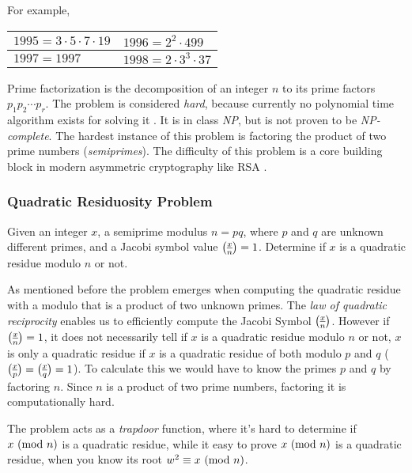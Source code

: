 For example,

\begin{center}
	\begin{tabular}{|l|l|}
		\hline
		$1995 = 3 \cdot 5 \cdot 7 \cdot 19$ & 
		$1996 = 2^2 \cdot 499$ \\
		\hline
		$1997 = 1997$ &
		$1998 = 2 \cdot 3^3 \cdot 37$\\
		\hline
	\end{tabular}
\end{center}


Prime factorization is the decomposition of an integer $n$ to its prime factors $p_1 p_2 \cdots p_r$.
The problem is considered \textit{hard}, because currently no polynomial time algorithm exists for solving it \cite{Buchmann2001}. It is in class \textit{NP}, but is not proven to be \textit{NP-complete}.
The hardest instance of this problem is factoring the product of two prime numbers (\textit{semiprimes}).
The difficulty of this problem is a core building block in modern asymmetric cryptography like RSA \cite{rivest1978method}.

\subsubsection{Quadratic Residuosity Problem}

\begin{definition}
	Given an integer $x$, a semiprime modulus $n = pq$, where $p$ and $q$ are unknown different primes, and a Jacobi symbol value $\legendre{x}{n} = 1$.
Determine if $x$ is a quadratic residue modulo $n$ or not.
\end{definition}
As mentioned before the problem emerges when computing the quadratic residue with a modulo that is a product of two unknown primes.
The \textit{law of quadratic reciprocity} enables us to efficiently compute the Jacobi Symbol $\legendre{x}{n}$.
However if $\legendre{x}{n} = 1$, it does not necessarily tell if $x$ is a quadratic residue modulo $n$ or not, $x$ is only a quadratic residue if $x$ is a quadratic residue of both modulo $p$ and $q$ ($\legendre{x}{p} = \legendre{x}{q} = 1$).
To calculate this we would have to know the primes $p$ and $q$ by factoring $n$.
Since $n$ is a product of two prime numbers, factoring it is computationally hard.

The problem acts as a \textit{trapdoor} function, where it's hard to determine if $x \ (\mathrm{mod}\ n)$ is a quadratic residue, 
while it easy to prove $x \ (\mathrm{mod}\ n)$ is a quadratic residue, when you know its root $w^2 \equiv x \ (\mathrm{mod}\ n)$.

